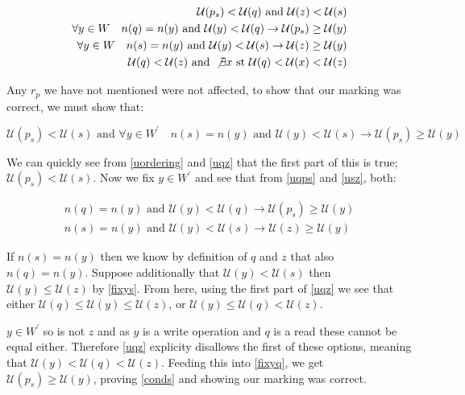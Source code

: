 \documentclass{report}
\begin{document}
\begin{align}
\mathcal{U}(p_s) < \mathcal{U}(q) \text{ and } \mathcal{U}(z) < \mathcal{U}(s) \label{uordering} \\
\forall y \in W \quad n(q) = n(y) \text{ and } \mathcal{U}(y) < \mathcal{U}(q) \rightarrow \mathcal{U}(p_s) \ge \mathcal{U}(y) \label{uqps} \\
\forall y \in W \quad n(s) = n(y) \text{ and } \mathcal{U}(y) < \mathcal{U}(s) \rightarrow \mathcal{U}(z) \ge \mathcal{U}(y) \label{usz} \\
\mathcal{U}(q) < \mathcal{U}(z) \text{ and } \not \exists x \text{ st } \mathcal{U}(q) < \mathcal{U}(x) < \mathcal{U}(z) \label{uqz}
\end{align}

Any $r_p$ we have not mentioned were not affected, to show that our marking was correct, we must show that:

\begin{equation} \label{conds}
\mathcal{U}(p_s) < \mathcal{U}(s) \text{ and }
\forall y \in W^\prime \quad n(s) = n(y) \text{ and } \mathcal{U}(y) < \mathcal{U}(s) \rightarrow \mathcal{U}(p_s) \ge \mathcal{U}(y)
\end{equation}

We can quickly see from \eqref{uordering} and \eqref{uqz} that the first part of this is true; $\mathcal{U}(p_s) < \mathcal{U}(s)$. Now we fix
$y \in W^\prime$ and see that from \eqref{uqps} and \eqref{usz}, both:

\begin{align}
n(q) = n(y) \text{ and } \mathcal{U}(y) < \mathcal{U}(q) \rightarrow \mathcal{U}(p_s) \ge \mathcal{U}(y) \label{fixyq} \\
n(s) = n(y) \text{ and } \mathcal{U}(y) < \mathcal{U}(s) \rightarrow \mathcal{U}(z) \ge \mathcal{U}(y) \label{fixys}
\end{align}

If $n(s) = n(y)$ then we know by definition of $q$ and $z$ that also $n(q) = n(y)$. Suppose additionally that $\mathcal{U}(y) < \mathcal{U}(s)$ then
$\mathcal{U}(y) \le \mathcal{U}(z)$ by \eqref{fixys}. From here, using the first part of \eqref{uqz} we see that either $\mathcal{U}(q) \le \mathcal{U}(y) \le \mathcal{U}(z)$, or
$\mathcal{U}(y) \le \mathcal{U}(q) < \mathcal{U}(z)$.

$y \in W^\prime$ so is not $z$ and as $y$ is a write operation and $q$ is a read these cannot be equal either. Therefore \eqref{uqz} explicity disallows
the first of these options, meaning that $\mathcal{U}(y) < \mathcal{U}(q) < \mathcal{U}(z)$. Feeding this into \eqref{fixyq}, we get
$\mathcal{U}(p_s) \ge \mathcal{U}(y)$, proving \eqref{conds} and showing our marking was correct.
\end{document}
